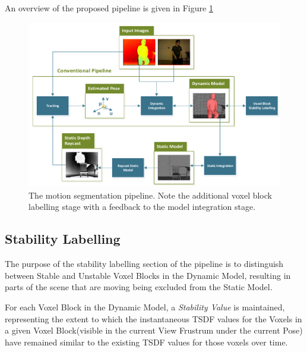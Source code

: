 An overview of the proposed pipeline is given in Figure \ref{fig:moseg_pipeline}
\begin{figure}[ht]
  \label{fig:moseg_pipeline}
  \centering
  \includegraphics[width=\linewidth]{figures/moseg/pipeline.pdf}
  \caption[Motion Segmentation Pipeline]{The motion segmentation pipeline. 
  Note the additional voxel block labelling stage with a feedback to the model 
  integration stage.}
\end{figure}

\subsection{Stability Labelling}
\label{sub:moseg_stability_labelling}
The purpose of the stability labelling section of the pipeline is to distinguish
between Stable and Unstable Voxel Blocks in the Dynamic Model, resulting in
parts of the scene that are moving being excluded from the Static Model.

For each Voxel Block in the Dynamic Model, a \emph{Stability Value} is
maintained, representing the extent to which the instantaneous TSDF values for
the Voxels in a given Voxel Block(visible in the current View Frustrum under the
current Pose) have remained similar to the existing TSDF values for those voxels
over time.

